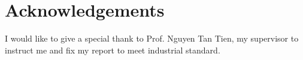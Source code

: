 \chapter*{Acknowledgements}
	
	I would like to give a special thank to Prof. Nguyen Tan Tien, my supervisor to instruct me and fix my report to meet industrial standard.